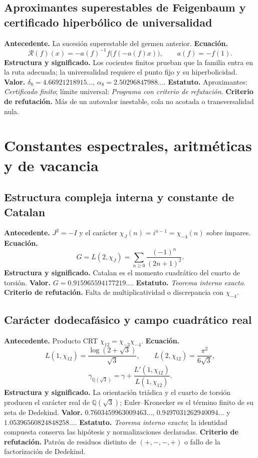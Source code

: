 \subsection*{Aproximantes superestables de Feigenbaum y certificado hiperbólico de universalidad}
\textbf{Antecedente.} La sucesi\'on superestable del germen anterior.
\textbf{Ecuaci\'on.}
\[
\mathcal R(f)(x)=-a(f)^{-1}f\bigl(f(-a(f)x)\bigr),
\qquad a(f)=-f(1).
\]
\textbf{Estructura y significado.} Los cocientes finitos prueban que la
familia entra en la ruta adecuada; la universalidad requiere el punto fijo y
su hiperbolicidad. \textbf{Valor.}
\(\delta_8=4.66921218915\ldots\),
\(\alpha_8=2.50296847988\ldots\). \textbf{Estatuto.} Aproximantes:
\emph{Certificado finito}; l\'imite universal: \emph{Programa con
criterio de refutación}. \textbf{Criterio de refutación.} M\'as de un autovalor inestable, cola no acotada
o transversalidad nula.

\section{Constantes espectrales, aritm\'eticas y de vacancia}

\subsection*{Estructura compleja interna y constante de Catalan }
\textbf{Antecedente.} \(J^2=-I\) y el car\'acter
\(\chi_J(n)=i^{n-1}=\chi_{-4}(n)\) sobre impares. \textbf{Ecuaci\'on.}
\[
G=L(2,\chi_J)=\sum_{n\ge0}\frac{(-1)^n}{(2n+1)^2}.
\]
\textbf{Estructura y significado.} Catalan es el momento cuadr\'atico del
cuarto de torsi\'on. \textbf{Valor.} \(G=0.915965594177219\ldots\).
\textbf{Estatuto.} \emph{Teorema interno exacto}. \textbf{Criterio de refutación.} Falta de
multiplicatividad o discrepancia con \(\chi_{-4}\).

\subsection*{Car\'acter dodecaf\'asico y campo cuadr\'atico real }
\textbf{Antecedente.} Producto CRT
\(\chi_{12}=\chi_{-3}\chi_{-4}\). \textbf{Ecuaci\'on.}
\[
L(1,\chi_{12})=\frac{\log(2+\sqrt3)}{\sqrt3},
\qquad L(2,\chi_{12})=\frac{\pi^2}{6\sqrt3},
\]
\[
\gamma_{\mathbb Q(\sqrt3)}
=\gamma+\frac{L'(1,\chi_{12})}{L(1,\chi_{12})}.
\]
\textbf{Estructura y significado.} La orientaci\'on tri\'adica y el cuarto de
torsi\'on producen el car\'acter real de \(\mathbb Q(\sqrt3)\);
Euler--Kronecker es
el t\'ermino finito de su zeta de Dedekind. \textbf{Valor.}
\(0.7603459963009463\ldots\), \(0.9497031262940094\ldots\) y
\(1.05396560824848258\ldots\). \textbf{Estatuto.} \emph{Teorema interno exacto};
la identidad compuesta conserva las hipótesis y normalizaciones declaradas.
\textbf{Criterio de refutación.} Patr\'on de residuos distinto de \((+,-,-,+)\) o fallo de
la factorizaci\'on de Dedekind.

